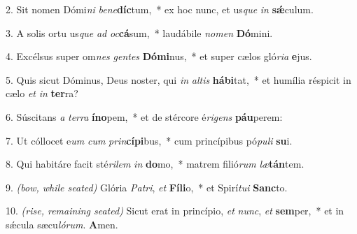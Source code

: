 2. Sit nomen Dómi\textit{ni} \textit{be}\textit{ne}\textbf{díc}tum,~* ex hoc nunc, et us\textit{que} \textit{in} \textbf{s\'{\ae}}culum.

3. A solis ortu us\textit{que} \textit{ad} \textit{oc}\textbf{cá}sum,~* laudábile \textit{no}\textit{men} \textbf{Dó}mini.

4. Excélsus super om\textit{nes} \textit{gen}\textit{tes} \textbf{Dó}\textbf{mi}nus,~* et super cælos gló\textit{ri}\textit{a} \textbf{e}jus.

5. Quis sicut Dóminus, Deus noster, qui \textit{in} \textit{al}\textit{tis} \textbf{há}\textbf{bi}tat,~* et humília réspicit in cælo \textit{et} \textit{in} \textbf{ter}ra?

6. Súscitans \textit{a} \textit{ter}\textit{ra} \textbf{ín}\textbf{o}pem,~* et de stércore é\textit{ri}\textit{gens} \textbf{páu}perem:

7. Ut cóllocet e\textit{um} \textit{cum} \textit{prin}\textbf{cí}\textbf{pi}bus,~* cum princípibus pó\textit{pu}\textit{li} \textbf{su}i.

8. Qui habitáre facit sté\textit{ri}\textit{lem} \textit{in} \textbf{do}mo,~* matrem filió\textit{rum} \textit{læ}\textbf{tán}tem.

9. {\color{red}\textit{(bow, while seated)}} Glória \textit{Pa}\textit{tri}, \textit{et} \textbf{Fí}\textbf{li}o,~* et Spirí\textit{tu}\textit{i} \textbf{Sanc}to.

10. {\color{red}\textit{(rise, remaining seated)}}  Sicut erat in princípio, \textit{et} \textit{nunc}, \textit{et} \textbf{sem}per,~* et in s\'{\ae}cula sæcu\textit{ló}\textit{rum}. \textbf{A}men.
